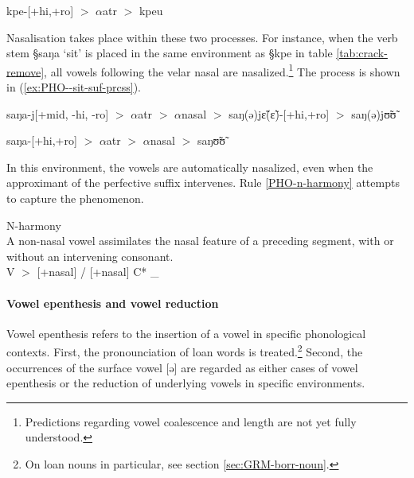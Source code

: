 \begin{exe}
\ex\label{ex:PHO-suf-ass-prcss}
kpe-[{\sc +hi,+ro}]   $>$ $\alpha${\sc atr} $>$ kpeu
\end{exe}

Nasalisation takes place within these two processes. For instance, when the verb
stem {\S saŋa} `sit' is placed in the same environment as {\S kpe} in table
\ref{tab:crack-remove}, all vowels following the velar nasal are
nasalized.\footnote{Predictions regarding  vowel coalescence and  length are
not yet fully understood.}  The
process is shown in (\ref{ex:PHO--sit-suf-prcss}).

\begin{exe}
\ex\label{ex:PHO--sit-suf-prcss}
\begin{xlist}

\ex\label{ex:PHO-sit-suf-perf-ass-prcss}
 saŋa-j[{\sc +mid, -hi, -ro}]  $>$  $\alpha${\sc atr} $>$ $\alpha${\sc nasal}
$>$ saŋ(ə)jɛ̃(ɛ̃)-[{\sc +hi,+ro}]  $>$ saŋ(ə)jʊ̃ʊ̃

\ex\label{ex:PHO--sit-suf-ass-prcss}
saŋa-[{\sc +hi,+ro}]   $>$ $\alpha${\sc atr} $>$ $\alpha${\sc nasal} $>$ saŋʊ̃ʊ̃
\end{xlist}
\end{exe}

In this environment, the vowels are  automatically nasalized, even when the
approximant of the perfective suffix intervenes. Rule \ref{PHO-n-harmony}
attempts to capture the phenomenon.

\begin{Rule}\label{PHO-n-harmony}{N-harmony}\\
A non-nasal vowel assimilates the nasal feature of a preceding segment, with or
without an intervening consonant. \\
 V $>$  [{\sc +nasal}] /  [{\sc +nasal}] C*  \_  
\end{Rule}




\paragraph{Vowel epenthesis and vowel reduction}
\label{sec:epenthesis}


Vowel epenthesis refers to the insertion of a vowel in specific phonological
contexts. First,  the pronounciation of loan words is treated.\footnote{On  loan
nouns in particular, see section \ref{sec:GRM-borr-noun}.}  Second,  the
occurrences of the surface vowel [ə] are regarded as  either cases of vowel
epenthesis or the reduction of  underlying vowels in specific environments. 



